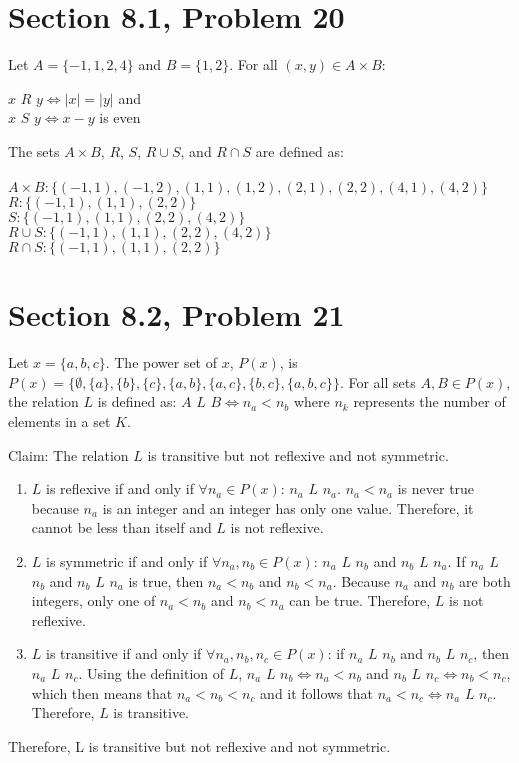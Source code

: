 \documentclass{article}
\author{Nathan Stouffer}
\begin{document}
\section*{Section 8.1, Problem 20}
Let $A=\{-1,1,2,4\}$ and $B=\{1,2\}$. For all $(x,y)\in A \times B$:
\begin{center}
	$x$ $R$ $y\iff |x|=|y|$ and \\
	$x$ $S$ $y\iff x-y$ is even
\end{center}
The sets $A \times B$, $R$, $S$, $R \cup S$, and $R \cap S$ are defined as: \\\\
$A \times B: \{(-1,1), (-1,2), (1,1), (1,2), (2,1), (2,2), (4,1), (4,2)\}$ \\
$R: \{(-1,1), (1,1), (2,2)\}$ \\
$S: \{(-1,1),(1,1),(2,2),(4,2)\}$ \\
$R \cup S: \{(-1,1),(1,1),(2,2),(4,2)\}$ \\
$R \cap S: \{(-1,1),(1,1),(2,2)\}$

\clearpage
\header
\section*{Section 8.2, Problem 21}
Let $x=\{a,b,c\}$. The power set of $x$, $P(x)$, is $P(x)=\{\emptyset, \{a\}, \{b\}, \{c\}, \{a,b\}, \{a,c\}, \{b,c\}, \{a,b,c\} \}$. For all sets $A,B\in P(x)$, the relation $L$ is defined as: $A$ $L$ $B\iff n_a < n_b$ where $n_k$ represents the number of elements in a set $K$.

Claim: The relation $L$ is transitive but not reflexive and not symmetric.

\begin{enumerate}
	\item $L$ is reflexive if and only if $\forall n_a \in P(x)$: $n_a$ $L$ $n_a$. $n_a<n_a$ is never true because $n_a$ is an integer and an integer has only one value. Therefore, it cannot be less than itself and $L$ is not reflexive.
	\item $L$ is symmetric if and only if $\forall n_a, n_b \in P(x)$: $n_a$ $L$ $n_b$ and $n_b$ $L$ $n_a$. If $n_a$ $L$ $n_b$ and $n_b$ $L$ $n_a$ is true, then $n_a<n_b$ and $n_b<n_a$. Because $n_a$ and $n_b$ are both integers, only one of $n_a<n_b$ and $n_b<n_a$ can be true. Therefore, $L$ is not reflexive.
	\item $L$ is transitive if and only if $\forall n_a,n_b,n_c \in P(x)$: if $n_a$ $L$ $n_b$ and $n_b$ $L$ $n_c$, then $n_a$ $L$ $n_c$. Using the definition of $L$,  $n_a$ $L$ $n_b \iff n_a < n_b$ and $n_b$ $L$ $n_c \iff n_b < n_c$, which then means that $n_a < n_b < n_c$ and it follows that $n_a < n_c \iff n_a$ $L$ $n_c$. Therefore, $L$ is transitive.
\end{enumerate}
Therefore, L is transitive but not reflexive and not symmetric.
\end{document}
